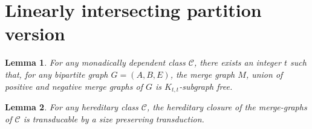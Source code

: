 \documentclass[11pt]{article}
\newtheorem{lemma}{Lemma}
\theoremstyle{definition}
\newcommand{\CC}{{\mathscr C}}
\begin{document}
\section{Linearly intersecting partition version}
\begin{lemma}\label{lem:merge_deg2}
For any monadically dependent class $\CC$, there exists an integer $t$ such that, for any bipartite graph $G = (A, B, E)$, the merge graph $M$, union of positive and negative merge graphs of $G$ is $K_{t, t}$-subgraph free.
\end{lemma}

\begin{lemma}\label{lem:merge_graph_sp}
For any hereditary class $\mathcal C$, the hereditary closure of the merge-graphs of $\mathcal C$ is transducable by a size preserving transduction.
\end{lemma}
\end{document}
